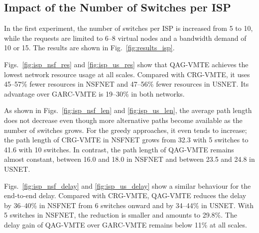 
\subsection{Impact of the Number of Switches per ISP}
\label{subsec:isp}

In the first experiment, the number of switches per ISP is increased from 5 to 10, while the requests are limited to 6--8 virtual nodes and a bandwidth demand of 10 or 15. The results are shown in Fig.~\ref{fig:results_isp}.

Figs.~\ref{fig:isp_nsf_res} and \ref{fig:isp_us_res} show that QAG-VMTE achieves the lowest network resource usage at all scales. Compared with CRG-VMTE, it uses 45--57\% fewer resources in NSFNET and 47--56\% fewer resources in USNET. Its advantage over GARC-VMTE is 19--30\% in both networks.

As shown in Figs.~\ref{fig:isp_nsf_len} and \ref{fig:isp_us_len}, the average path length does not decrease even though more alternative paths become available as the number of switches grows. For the greedy approaches, it even tends to increase; the path length of CRG-VMTE in NSFNET grows from 32.3 with 5 switches to 41.6 with 10 switches. In contrast, the path length of QAG-VMTE remains almost constant, between 16.0 and 18.0 in NSFNET and between 23.5 and 24.8 in USNET.

Figs.~\ref{fig:isp_nsf_delay} and \ref{fig:isp_us_delay} show a similar behaviour for the end-to-end delay. Compared with CRG-VMTE, QAG-VMTE reduces the delay by 36--40\% in NSFNET from 6 switches onward and by 34--44\% in USNET. With 5 switches in NSFNET, the reduction is smaller and amounts to 29.8\%. The delay gain of QAG-VMTE over GARC-VMTE remains below 11\% at all scales.

